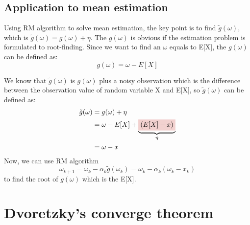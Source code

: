  \subsection{Application to mean estimation}

    Using RM algorithm to solve mean estimation, the key point is to find $\tilde{g}(\omega)$, which is
    $\tilde{g}(\omega)=g(\omega)+\eta$. The $g(\omega)$ is obvious if the estimation problem is formulated to root-finding.
    Since we want to find an $\omega$ equals to E[X], the $g(\omega)$ can be defined as:
    \begin{equation*}
      g(\omega) = \omega - E[X]
    \end{equation*}
    \par We know that $\tilde{g}(\omega)$ is $g(\omega)$ plus a noisy observation which is the difference between the
    observation value of random variable X and E[X], so $\tilde{g}(\omega)$ can be defined as:
    \begin{align*}
      \tilde{g}(\omega) & = g(\omega) + \eta                                                            \\
                        & = \omega - E[X] + \underbrace{\colorbox{myred!20!white}{$(E[X] - x)$}}_{\eta} \\
                        & = \omega - x
    \end{align*}
    Now, we can use RM algorithm
    \begin{equation*}
      \omega_{k+1} = \omega_{k} - \alpha_{k}\tilde{g}(\omega_{k}) = \omega_{k} - \alpha_{k}(\omega_{k}-x_{k})
    \end{equation*}
    to find the root of $g(\omega)$ which is the E[X]. 

\section{Dvoretzky's converge theorem}

